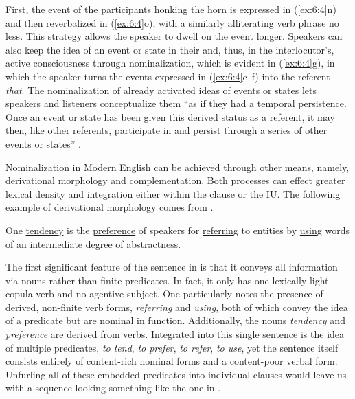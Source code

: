 \noindent First, the event of the participants honking the horn is expressed in (\ref{ex:6:4}n) and then reverbalized in (\ref{ex:6:4}o), with a similarly alliterating verb phrase no less. This strategy allows the speaker to dwell on the event longer. Speakers can also keep the idea of an event or state in their and, thus, in the interlocutor’s, active consciousness through nominalization, which is evident in (\ref{ex:6:4}g), in which the speaker turns the events expressed in (\ref{ex:6:4}c--f) into the referent \textit{that}. The nominalization of already activated ideas of events or states lets speakers and listeners conceptualize them “as if they had a temporal persistence. Once an event or state has been given this derived status as a referent, it may then, like other referents, participate in and persist through a series of other events or states” \citep[68]{Chafe1994}.

\begin{sloppypar}
Nominalization in Modern English can be achieved through other means, namely, derivational morphology and complementation. Both processes can effect greater lexical density and integration either within the clause or the IU. The following example of derivational morphology comes from \citet[137]{Chafe1981}.
\end{sloppypar}

\ea%
    \label{ex:6:5}

          One \ul{tendency} is the \ul{preference} of speakers for \ul{referring} to entities by \ul{using} words of an intermediate degree of abstractness.
    \z

\noindent The first significant feature of the sentence in  is that it conveys all information via nouns rather than finite predicates. In fact, it only has one lexically light copula verb and no agentive subject. One particularly notes the presence of derived, non-finite verb forms, \textit{referring} and \textit{using}, both of which convey the idea of a predicate but are nominal in function. Additionally, the nouns \textit{tendency} and \textit{preference} are derived from verbs. Integrated into this single sentence is the idea of multiple predicates, \textit{to tend}, \textit{to prefer}, \textit{to refer}, \textit{to use}, yet the sentence itself consists entirely of content-rich nominal forms and a content-poor verbal form. Unfurling all of these embedded predicates into individual clauses would leave us with a sequence looking something like the one in .

